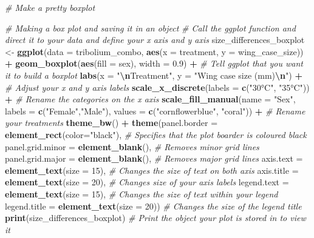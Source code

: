 \documentclass[
]{book}
\newenvironment{Shaded}{\begin{snugshade}}{\end{snugshade}}
\newcommand{\AttributeTok}[1]{\textcolor[rgb]{0.13,0.29,0.53}{#1}}
\newcommand{\CommentTok}[1]{\textcolor[rgb]{0.56,0.35,0.01}{\textit{#1}}}
\newcommand{\DecValTok}[1]{\textcolor[rgb]{0.00,0.00,0.81}{#1}}
\newcommand{\FloatTok}[1]{\textcolor[rgb]{0.00,0.00,0.81}{#1}}
\newcommand{\FunctionTok}[1]{\textcolor[rgb]{0.13,0.29,0.53}{\textbf{#1}}}
\newcommand{\NormalTok}[1]{#1}
\newcommand{\OtherTok}[1]{\textcolor[rgb]{0.56,0.35,0.01}{#1}}
\newcommand{\SpecialCharTok}[1]{\textcolor[rgb]{0.81,0.36,0.00}{\textbf{#1}}}
\newcommand{\StringTok}[1]{\textcolor[rgb]{0.31,0.60,0.02}{#1}}
\begin{document}
\begin{Shaded}
\begin{Highlighting}[]
\CommentTok{\# Make a pretty boxplot}

\CommentTok{\# Making a box plot and saving it in an object}
\CommentTok{\# Call the ggplot function and direct it to your data and define your x axis and y axis}
\NormalTok{size\_differences\_boxplot }\OtherTok{\textless{}{-}} \FunctionTok{ggplot}\NormalTok{(}\AttributeTok{data =}\NormalTok{ tribolium\_combo, }\FunctionTok{aes}\NormalTok{(}\AttributeTok{x =}\NormalTok{ treatment, }\AttributeTok{y =}\NormalTok{ wing\_case\_size)) }\SpecialCharTok{+} 
  \FunctionTok{geom\_boxplot}\NormalTok{(}\FunctionTok{aes}\NormalTok{(}\AttributeTok{fill =}\NormalTok{ sex), }\AttributeTok{width =} \FloatTok{0.9}\NormalTok{) }\SpecialCharTok{+} \CommentTok{\# Tell ggplot that you want it to build a boxplot}
  \FunctionTok{labs}\NormalTok{(}\AttributeTok{x =} \StringTok{"}\SpecialCharTok{\textbackslash{}n}\StringTok{Treatment"}\NormalTok{, }\AttributeTok{y =} \StringTok{"Wing case size (mm)}\SpecialCharTok{\textbackslash{}n}\StringTok{"}\NormalTok{) }\SpecialCharTok{+} \CommentTok{\# Adjust your x and y axis labels }
  \FunctionTok{scale\_x\_discrete}\NormalTok{(}\AttributeTok{labels =} \FunctionTok{c}\NormalTok{(}\StringTok{"30°C"}\NormalTok{, }\StringTok{"35°C"}\NormalTok{)) }\SpecialCharTok{+} \CommentTok{\# Rename the categories on the x axis }
  \FunctionTok{scale\_fill\_manual}\NormalTok{(}\AttributeTok{name =} \StringTok{"Sex"}\NormalTok{, }\AttributeTok{labels =} \FunctionTok{c}\NormalTok{(}\StringTok{"Female"}\NormalTok{,}\StringTok{"Male"}\NormalTok{), }\AttributeTok{values =} \FunctionTok{c}\NormalTok{(}\StringTok{"cornflowerblue"}\NormalTok{, }\StringTok{"coral"}\NormalTok{)) }\SpecialCharTok{+} \CommentTok{\# Rename your treatments}
  \FunctionTok{theme\_bw}\NormalTok{() }\SpecialCharTok{+}
  \FunctionTok{theme}\NormalTok{(}\AttributeTok{panel.border =} \FunctionTok{element\_rect}\NormalTok{(}\AttributeTok{color=}\StringTok{"black"}\NormalTok{), }\CommentTok{\# Specifies that the plot boarder is coloured black}
        \AttributeTok{panel.grid.minor =} \FunctionTok{element\_blank}\NormalTok{(), }\CommentTok{\# Removes minor grid lines }
        \AttributeTok{panel.grid.major =} \FunctionTok{element\_blank}\NormalTok{(), }\CommentTok{\# Removes major grid lines }
        \AttributeTok{axis.text =} \FunctionTok{element\_text}\NormalTok{(}\AttributeTok{size =} \DecValTok{15}\NormalTok{), }\CommentTok{\# Changes the size of text on both axis }
        \AttributeTok{axis.title =} \FunctionTok{element\_text}\NormalTok{(}\AttributeTok{size =} \DecValTok{20}\NormalTok{), }\CommentTok{\# Changes size of your axis labels }
        \AttributeTok{legend.text =} \FunctionTok{element\_text}\NormalTok{(}\AttributeTok{size =} \DecValTok{15}\NormalTok{), }\CommentTok{\# Changes the size of text within your legend}
        \AttributeTok{legend.title =} \FunctionTok{element\_text}\NormalTok{(}\AttributeTok{size =} \DecValTok{20}\NormalTok{)) }\CommentTok{\# Changes the size of the legend title  }
\FunctionTok{print}\NormalTok{(size\_differences\_boxplot) }\CommentTok{\# Print the object your plot is stored in to view it}


\end{Highlighting}
\end{Shaded}
\end{document}
